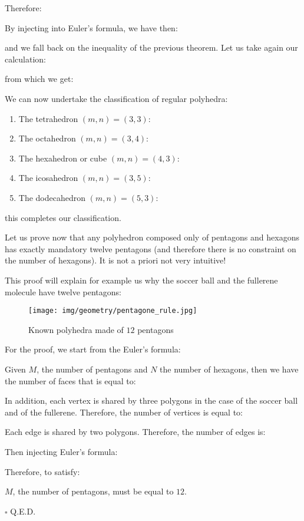 {	Therefore:
	
	By injecting into Euler's formula, we have then:
	
	and we fall back on the inequality of the previous theorem. Let us take again our calculation:
	
	from which we get:
	
	We can now undertake the classification of regular polyhedra:
	\begin{enumerate}
		\item The tetrahedron $(m,n)=(3,3)$:
		
		
		\item The octahedron $(m,n)=(3,4)$:
		
		
		\item The hexahedron or cube $(m,n)=(4,3)$:
		
		
		\item The icosahedron $(m,n)=(3,5)$:
		
		
		\item The dodecahedron $(m,n)=(5,3)$:
		
	\end{enumerate}
	this completes our classification.
	
	Let us prove now that any polyhedron composed only of pentagons and hexagons has exactly mandatory  twelve pentagons (and therefore there is no constraint on the number of hexagons). It is not a priori not very intuitive!
	
	This proof will explain for example us why the soccer ball and the fullerene molecule have twelve pentagons:
	\begin{figure}[H]
		\centering
		\texttt{[image: img/geometry/pentagone\_rule.jpg]}
		\caption{Known polyhedra made of $12$ pentagons}
	\end{figure}
	\begin{dem}
	For the proof, we start from the Euler's formula:
	
	Given $M$, the number of pentagons and $N$ the number of hexagons, then we have the number of faces that is equal to:
	
	In addition, each vertex is shared by three polygons in the case of the soccer ball and of the fullerene. Therefore, the number of vertices is equal to:
	
	Each edge is shared by two polygons. Therefore, the number of edges is:
	
	Then injecting Euler's formula:
	
	Therefore, to satisfy:
	
	$M$, the number of pentagons, must be equal to $12$.
	\begin{flushright}
		$\square$  Q.E.D.
	\end{flushright}
	\end{dem}
	
}
